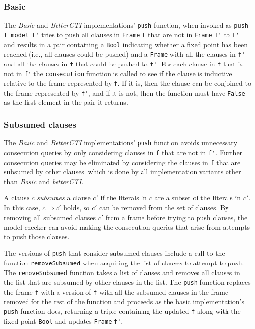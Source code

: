 \documentclass[12pt,a4paper,twoside,openright]{report}
\begin{document}
{\subsubsection{Basic}
The {\it Basic} and {\it BetterCTI} implementations' \verb,push, function,
when invoked as \verb,push f model f', tries to push all clauses in \verb,Frame, \verb,f,
that are not in \verb,Frame, \verb,f', to \verb,f', and
results in a pair containing a \verb,Bool, indicating whether a fixed point has been reached
(i.e., all clauses could be pushed) and a \verb,Frame, with all the clauses in \verb,f', and all
the clauses in \verb,f, that could be pushed to \verb,f',.
For each clause in \verb,f, that is not in \verb,f', the \verb,consecution, function is called to
see if the clause is inductive relative to the frame represented by \verb,f,. If it is, then
the clause can be conjoined to the frame represented by \verb,f',, and if it is not, then the
function must have \verb,False, as the first element in the pair it returns.

\subsubsection{Subsumed clauses}
The {\it Basic} and {\it BetterCTI} implementations' \verb,push, function avoids unnecessary
consecution queries by only considering clauses in \verb,f, that are not in \verb,f',.
Further consecution queries may be eliminated by considering the clauses in \verb,f, that are
subsumed by other clauses, which is done by all implementation variants other than {\it Basic}
and {\it betterCTI}.

A clause $c$ \emph{subsumes} a clause $c'$ if the literals in $c$ are a subset of the literals
in $c'$. In this case, $c \Rightarrow c'$ holds, so $c'$ can be removed from the set of clauses. By
removing all subsumed clauses $c'$ from a frame before trying to push clauses, the model
checker can avoid making the consecution queries that arise from attempts to push those clauses.

The versions of \verb,push, that consider subsumed clauses include a call to the function
\verb,removeSubsumed, when acquiring the list of clauses to attempt to push.
The \verb,removeSubsumed, function takes a list of clauses and removes all clauses in the list
that are subsumed by other clauses in the list. The \verb,push, function replaces the frame
\verb,f, with a version of \verb,f, with all the subsumed clauses in the frame removed for
the rest of the function and proceeds as the basic implementation's \verb,push, function does,
returning a triple containing the updated \verb,f, along with the fixed-point \verb,Bool,
and updates \verb,Frame, \verb,f',.

}
\end{document}
